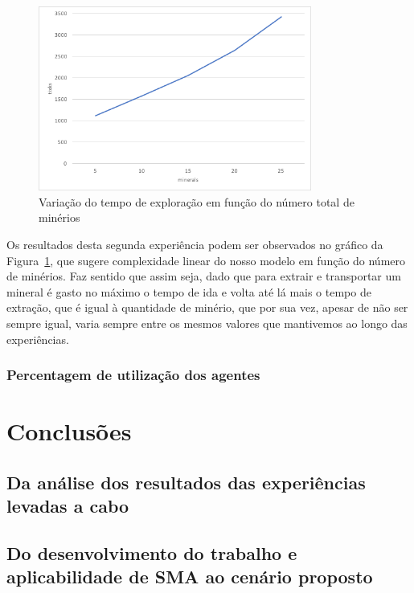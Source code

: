 \documentclass[12pt]{report}
\begin{document}
\begin{figure}[h]
	\centering
    \includegraphics[width=0.8\textwidth]{ticks-minerals}
	\caption{Variação do tempo de exploração em função do número total de minérios}
	\label{ticks-minerals}
\end{figure}

Os resultados desta segunda experiência podem ser observados no gráfico da Figura~\ref{ticks-minerals}, que sugere complexidade linear do nosso modelo em função do número de minérios. Faz sentido que assim seja, dado que para extrair e transportar um mineral é gasto no máximo o tempo de ida e volta até lá mais o tempo de extração, que é igual à quantidade de minério, que por sua vez, apesar de não ser sempre igual, varia sempre entre os mesmos valores que mantivemos ao longo das experiências.

\subsection{Percentagem de utilização dos agentes}

\chapter{Conclusões}

\section{Da análise dos resultados das experiências levadas a cabo}

\section{Do desenvolvimento do trabalho e aplicabilidade de SMA ao cenário proposto}
\end{document}
